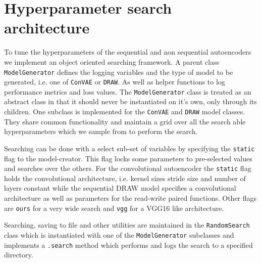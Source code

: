 \section{Hyperparameter search architecture}\label{sec:hyperparam_search_arch}

To tune the hyperparameters of the sequential and non sequential autoencoders we implement an object oriented searching framework. A parent class \lstinline{ModelGenerator} defines the logging variables and the type of model to be generated, i.e. one of \lstinline{ConVAE} or \lstinline{DRAW}. As well as helper functions to log performance metrics and loss values. The \lstinline{ModelGenerator} class is treated as an abstract class in that it should never be instantiated on it's own, only through its children. One subclass is implemented for the \lstinline{ConVAE} and \lstinline{DRAW} model classes. They share common functionality and maintain a grid over all the search able hyperparameters which we sample from to perform the search.

Searching can be done with a select sub-set of variables by specifying the \lstinline{static} flag to the model-creator. This flag locks some parameters to pre-selected values and searches over the others. For the convolutional autoencoder the \lstinline{static} flag holds the convolutional architecture, i.e. kernel sizes stride size and number of layers constant while the sequential DRAW model specifies a convolutional architecture as well as parameters for the read-write paired functions. Other flags are \lstinline{ours} for a very wide search and \lstinline{vgg} for a VGG16 like architecture. 

Searching, saving to file and other utilities are maintained in the \lstinline{RandomSearch} class which is instantiated with one of the \lstinline{ModelGenerator} subclasses and implements a \lstinline{.search} method which performs and logs the search to a specified directory. 